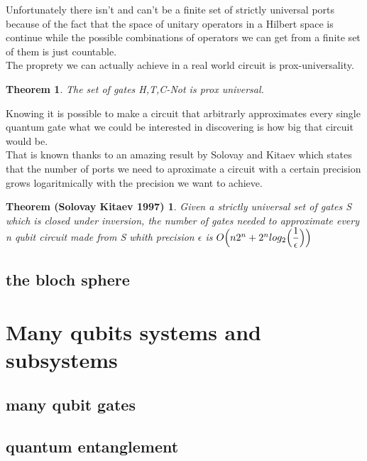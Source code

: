 \documentclass{article}
\newtheorem{Solovay-Kitaev}{Theorem (Solovay Kitaev 1997)}
\newtheorem{Prox-Universal-Set}{Theorem}
\begin{document}
Unfortunately there isn't and can't be a finite set of strictly
universal
ports because of the fact that the space of unitary operators in a
Hilbert space is continue while the possible combinations of
operators we can get from a finite set of them is just countable.\\
The proprety we can actually achieve in a real world circuit is
prox-universality.\\

\begin{Prox-Universal-Set}
The set of gates {H,T,C-Not} is prox universal.
\end{Prox-Universal-Set}

Knowing it is possible to make a circuit that arbitrarly approximates
every
single quantum gate what we could be interested in discovering is how
big that circuit would be.\\

That is known thanks to an amazing result by Solovay and Kitaev which
states
that the number of ports we need to aproximate a circuit with a certain
precision grows logaritmically with the precision we want to achieve.
  
\begin{Solovay-Kitaev}

  Given a strictly universal set of gates S which is closed under inversion,
  the number of gates needed to approximate every n qubit circuit made
  from S whith precision $\epsilon$ is
  $O\Bigl(n2^n+2^nlog_2 \Bigl( \dfrac{1}{\epsilon}\Bigl)\Bigl)$
  

\end{Solovay-Kitaev}


\subsection{the bloch sphere}

\newpage

\section{Many qubits systems and subsystems}



\subsection{many qubit gates}

\subsection{quantum entanglement}
\end{document}
